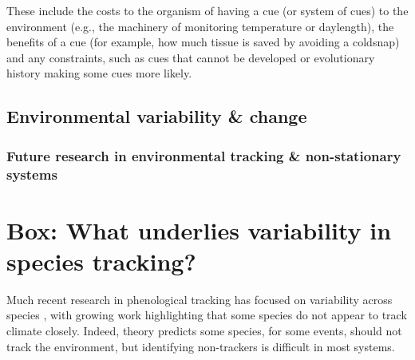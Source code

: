 \documentclass[11pt,letterpaper]{article}
\begin{document}

These include the costs to the organism of having a cue (or system of cues) to the environment (e.g., the machinery of monitoring temperature or daylength), the benefits of a cue (for example, how much tissue is saved by avoiding a coldsnap) and any constraints, such as cues that cannot be developed or evolutionary history making some cues more likely. 




\subsection{Environmental variability \& change}








\subsubsection{Future research in environmental tracking \& non-stationary systems}

\section{Box: What underlies variability in species tracking?}
Much recent research in phenological tracking has focused on variability across species \citep[e.g.,][]{Willis:2008bf,Cook:2012pnas,bolmgren2013,CaraDonna2014}, with growing work highlighting that some species do not appear to track climate closely. Indeed, theory predicts some species, for some events, should not track the environment, but identifying non-trackers is difficult in most systems. %
\end{document}

